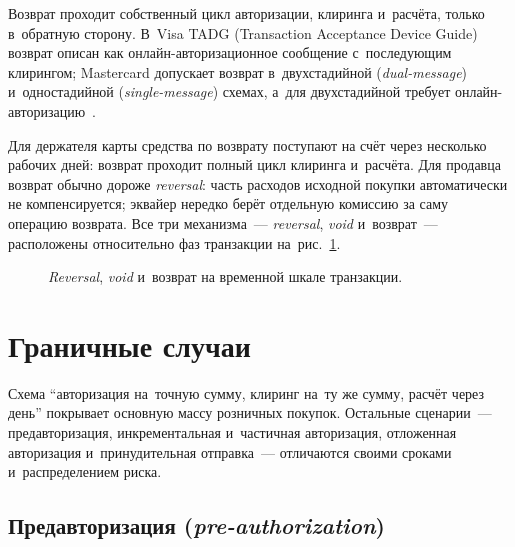 Возврат проходит собственный цикл авторизации, клиринга и~расчёта, только
в~обратную сторону. В~Visa TADG (Transaction Acceptance Device Guide) возврат
описан как онлайн-авторизационное сообщение с~последующим клирингом; Mastercard
допускает возврат в~двухстадийной (\textit{dual-message}) и~одностадийной
(\textit{single-message}) схемах, а~для двухстадийной требует
онлайн-авторизацию~\cite{visa-tadg,mc-tpr}.

Для держателя карты средства по возврату поступают на счёт через несколько
рабочих дней: возврат проходит полный цикл клиринга и~расчёта. Для продавца
возврат обычно дороже \textit{reversal}: часть расходов исходной покупки автоматически не
компенсируется; эквайер нередко берёт отдельную комиссию за саму операцию
возврата. Все три механизма~--- \textit{reversal}, \textit{void} и~возврат~--- расположены
относительно фаз транзакции на~рис.~\ref{fig:tx-cancellation-timeline}.

\begin{figure}[tbp]
  \centering
  \caption{\textit{Reversal}, \textit{void} и~возврат на временной шкале транзакции.}\label{fig:tx-cancellation-timeline}
\end{figure}


\section{Граничные случаи}\label{sec:tx-edge-cases}

Схема \enquote{авторизация на~точную сумму, клиринг на~ту же сумму, расчёт
через день} покрывает основную массу розничных покупок. Остальные сценарии~---
предавторизация, инкрементальная и~частичная авторизация, отложенная
авторизация и~принудительная отправка~--- отличаются своими сроками
и~распределением риска.

\subsection*{Предавторизация (\textit{pre-authorization})}

